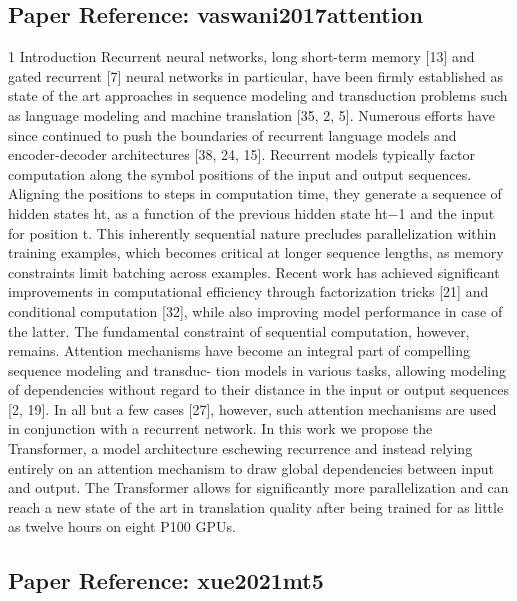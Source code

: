 \subsection*{Paper Reference: vaswani2017attention}

1 Introduction Recurrent neural networks, long short-term memory [13] and gated recurrent [7] neural networks in particular, have been firmly established as state of the art approaches in sequence modeling and transduction problems such as language modeling and machine translation [35, 2, 5]. Numerous efforts have since continued to push the boundaries of recurrent language models and encoder-decoder architectures [38, 24, 15]. Recurrent models typically factor computation along the symbol positions of the input and output sequences. Aligning the positions to steps in computation time, they generate a sequence of hidden states ht, as a function of the previous hidden state ht−1 and the input for position t. This inherently sequential nature precludes parallelization within training examples, which becomes critical at longer sequence lengths, as memory constraints limit batching across examples. Recent work has achieved significant improvements in computational efficiency through factorization tricks [21] and conditional computation [32], while also improving model performance in case of the latter. The fundamental constraint of sequential computation, however, remains. Attention mechanisms have become an integral part of compelling sequence modeling and transduc- tion models in various tasks, allowing modeling of dependencies without regard to their distance in the input or output sequences [2, 19]. In all but a few cases [27], however, such attention mechanisms are used in conjunction with a recurrent network. In this work we propose the Transformer, a model architecture eschewing recurrence and instead relying entirely on an attention mechanism to draw global dependencies between input and output. The Transformer allows for significantly more parallelization and can reach a new state of the art in translation quality after being trained for as little as twelve hours on eight P100 GPUs.

\vspace{18pt}


\subsection*{Paper Reference: xue2021mt5}

